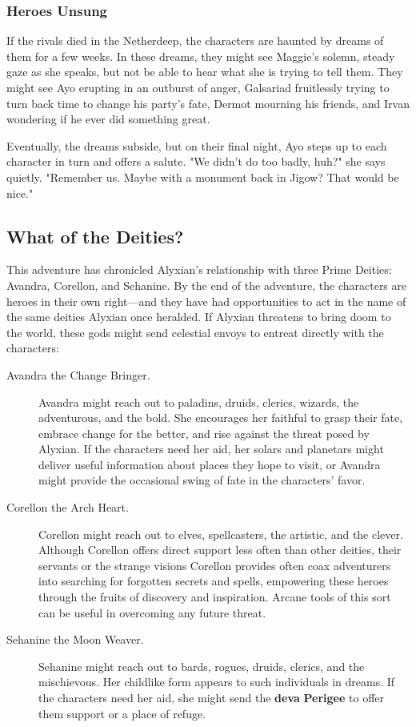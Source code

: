 \documentclass[10pt,a4paper,twoside,fancy,bg=print,twocolumn,openany,nodeprecatedcode]{dndbook}
\begin{document}
\subsubsection{Heroes Unsung}
If the rivals died in the Netherdeep, the characters are haunted by dreams of them for a few weeks. In these dreams, they might see Maggie's solemn, steady gaze as she speaks, but not be able to hear what she is trying to tell them. They might see Ayo erupting in an outburst of anger, Galsariad fruitlessly trying to turn back time to change his party's fate, Dermot mourning his friends, and Irvan wondering if he ever did something great.

Eventually, the dreams subside, but on their final night, Ayo steps up to each character in turn and offers a salute. "We didn't do too badly, huh?" she says quietly. "Remember us. Maybe with a monument back in Jigow? That would be nice."

\subsection{What of the Deities?}
This adventure has chronicled Alyxian's relationship with three Prime Deities: Avandra, Corellon, and Sehanine. By the end of the adventure, the characters are heroes in their own right—and they have had opportunities to act in the name of the same deities Alyxian once heralded. If Alyxian threatens to bring doom to the world, these gods might send celestial envoys to entreat directly with the characters:


\begin{description}
\item[Avandra the Change Bringer.]
Avandra might reach out to paladins, druids, clerics, wizards, the adventurous, and the bold. She encourages her faithful to grasp their fate, embrace change for the better, and rise against the threat posed by Alyxian. If the characters need her aid, her solars and planetars might deliver useful information about places they hope to visit, or Avandra might provide the occasional swing of fate in the characters' favor.
\item[Corellon the Arch Heart.]
Corellon might reach out to elves, spellcasters, the artistic, and the clever. Although Corellon offers direct support less often than other deities, their servants or the strange visions Corellon provides often coax adventurers into searching for forgotten secrets and spells, empowering these heroes through the fruits of discovery and inspiration. Arcane tools of this sort can be useful in overcoming any future threat.
\item[Sehanine the Moon Weaver.]
Sehanine might reach out to bards, rogues, druids, clerics, and the mischievous. Her childlike form appears to such individuals in dreams. If the characters need her aid, she might send the \textbf{deva} \textbf{Perigee} to offer them support or a place of refuge.
\end{description}
\end{document}

